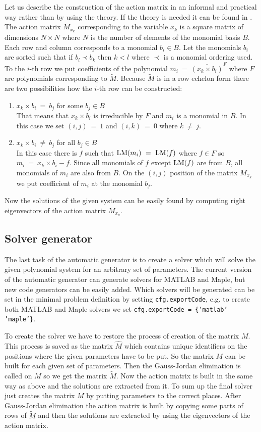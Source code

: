 Let us describe the construction of the action matrix in an informal and practical way rather than by using the theory. If the theory is needed it can be found in \cite{KukelovaAlgMethods}. The action matrix $M_{x_k}$ corresponding to the variable $x_k$ is a square matrix of dimensions $N \times N$ where $N$ is the number of elements of the monomial basis $B$. Each row and column corresponds to a monomial $b_i \in B$. Let the monomials $b_i$ are sorted such that if $b_l \prec b_k$ then $k < l$ where $\prec$ is a monomial ordering used. To the $i$-th row we put coefficients of the polynomial $m_i\ =\ \overline{(x_k \times b_i)}^F$ where $F$ are polynomials corresponding to $\tilde{M}$. Because $\tilde{M}$ is in a row echelon form there are two possibilities how the $i$-th row can be constructed:
\begin{enumerate}
  \item $x_k \times b_i\ =\ b_j$ for some $b_j \in B$\\
        That means that $x_k \times b_i$ is irreducible by $F$ and $m_i$ is a monomial in $B$. In this case we set $(i, j)\ =\ 1$ and $(i, k)\ =\ 0$ where $k\ \neq\ j$.
  \item $x_k \times b_i\ \neq\ b_j$ for all $b_j \in B$\\
	  In this case there is $f$ such that $\operatorname{LM}(m_i)\ =\ \operatorname{LM}(f)$ where $f \in F$ so $m_i\ =\ x_k\times b_i - f$. Since all monomials of $f$ except $\operatorname{LM}(f)$ are from $B$, all monomials of $m_i$ are also from $B$. On the $(i, j)$ position of the matrix $M_{x_k}$ we put coefficient of $m_i$ at the monomial $b_j$.
\end{enumerate}

Now the solutions of the given system can be easily found by computing right eigenvectors of the action matrix $M_{x_k}$.

\subsection{Solver generator}
The last task of the automatic generator is to create a solver which will solve the given polynomial system for an arbitrary set of parameters. The current version of the automatic generator can generate solvers for MATLAB and Maple, but new code generators can be easily added. Which solvers will be generated can be set in the minimal problem definition by setting \texttt{cfg.exportCode}, e.g. to create both MATLAB and Maple solvers we set \texttt{cfg.exportCode = \{'matlab' 'maple'\}}.

To create the solver we have to restore the process of creation of the matrix $M$. This process is saved as the matrix $\hat{M}$ which contains unique identifiers on the positions where the given parameters have to be put. So the matrix $M$ can be built for each given set of parameters. Then the Gauss-Jordan elimination is called on $M$ so we get the matrix $\tilde{M}$. Now the action matrix is built in the same way as above and the solutions are extracted from it. To sum up the final solver just creates the matrix $M$ by putting parameters to the correct places. After Gauss-Jordan elimination the action matrix is built by copying some parts of rows of $\tilde{M}$ and then the solutions are extracted by using the eigenvectors of the action matrix.

